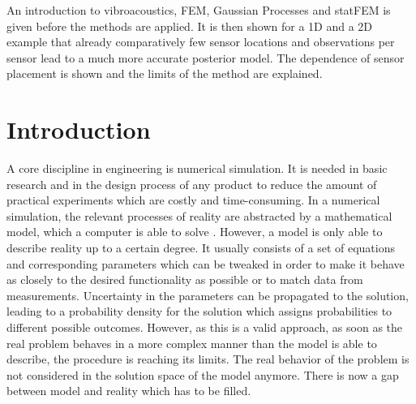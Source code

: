 \documentclass[%
  a4paper,oneside,%
  11pt,%
  smallchapters,
  style=printdev,
  extramargin,
  green,%
  rgb, <cmyk>
  ]{tubsbook}
\begin{document}
An introduction to vibroacoustics, FEM, Gaussian Processes and statFEM is given before the methods are applied. It is then shown for a 1D and a 2D example that already comparatively few sensor locations and observations per sensor lead to a much more accurate posterior model. The dependence of sensor placement is shown and the limits of the method are explained.

\tableofcontents



\listoffigures
\listoftables










\printnomenclature[6em]


\chapter{Introduction}

A core discipline in engineering is numerical simulation. It is needed in basic research and in the design process of any product to reduce the amount of practical experiments which are costly and time-consuming. In a numerical simulation, the relevant processes of reality are abstracted by a mathematical model, which a computer is able to solve \cite{Weisberg2015}.  However, a model is only able to describe reality up to a certain degree. It usually consists of a set of equations and corresponding parameters which can be tweaked in order to make it behave as closely to the desired functionality as possible or to match data from measurements. Uncertainty in the parameters can be propagated to the solution, leading to a probability density for the solution which assigns probabilities to different possible outcomes. However, as this is a valid approach, as soon as the real problem behaves in a more complex manner than the model is able to describe, the procedure is reaching its limits. The real behavior of the problem is not considered in the solution space of the model anymore.%
There is now a gap between model and reality which has to be filled.
\end{document}
